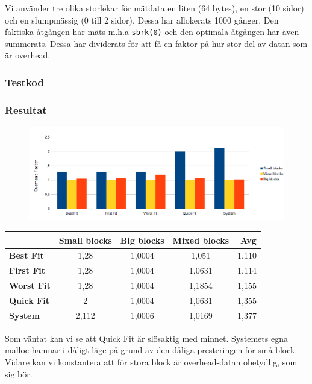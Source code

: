 \documentclass[a4paper,10pt,titlepage]{article}
\begin{document}
Vi använder tre olika storlekar för mätdata en liten (64 bytes), en stor (10 sidor) och en slumpmässig (0 till 2 sidor). Dessa har allokerats 1000 gånger. Den faktiska åtgången har mäts m.h.a \texttt{sbrk(0)} och den optimala åtgången har även summerats. Dessa har dividerats för att få en faktor på hur stor del av datan som är overhead.

\subsubsection{Testkod}

\scriptsize{}
\normalsize

\subsubsection{Resultat}

\begin{figure}[H]
	\includegraphics[width=\textwidth]{overhead.png}
\end{figure}

\begin{center}

	\begin{tabular}{ | >{\bfseries}l | c | c | c | r |}
		\hline
					& Small blocks	& Big blocks	& Mixed blocks	& Avg \\
		\hline
		Best Fit	& 1,28	& 1,0004	& 1,051		& 1,110 \\
		First Fit	& 1,28	& 1,0004	& 1,0631	& 1,114 \\
		Worst Fit	& 1,28	& 1,0004	& 1,1854	& 1,155 \\
		Quick Fit	& 2		& 1,0004	& 1,0631	& 1,355 \\
		System		& 2,112	& 1,0006	& 1,0169	& 1,377 \\
		\hline
	\end{tabular}
\end{center}

Som väntat kan vi se att Quick Fit är slösaktig med minnet. Systemets egna malloc hamnar i dåligt läge på grund av den dåliga presteringen för små block. Vidare kan vi konstantera att för stora block är overhead-datan obetydlig, som sig bör.
\end{document}
